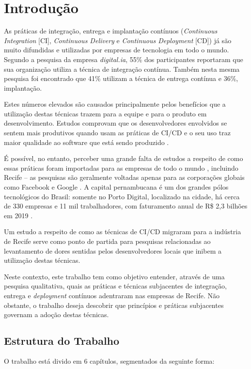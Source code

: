 
\chapter{Introdução}

As práticas de integração, entrega e implantação contínuos \cite{fowlerCI, fowlerCD} (\emph{Continuous Integration} [CI], \emph{Continuous Delivery} e \emph{Continuous Deployment} [CD]) já são muito difundidas e utilizadas por empresas de tecnologia em todo o mundo. Segundo a pesquisa da empresa \emph{digital.ia}\cite{stateAgileReport2020}, 55\% dos participantes reportaram que sua organização utiliza a técnica de integração contínua. Também nesta mesma pesquisa foi encontrado que 41\% utilizam a técnica de entrega contínua e 36\%, implantação.

Estes números elevados são causados principalmente pelos benefícios que a utilização destas técnicas trazem para a equipe e para o produto em desenvolvimento. Estudos comprovam que os desenvolvedores envolvidos se sentem mais produtivos quando usam as práticas de CI/CD \cite{hilton2016} e o seu uso traz maior qualidade ao software que está sendo produzido \cite{savor2015}. 

É possível, no entanto, perceber uma grande falta de estudos a respeito de como essas práticas foram importadas para as empresas de todo o mundo \cite{empiricalStudy2016}, incluindo Recife -- as pesquisas são geralmente voltadas apenas para as corporações globais como Facebook \cite{savor2015} e Google \cite{googleCi}. A capital pernambucana é um dos grandes pólos tecnológicos do Brasil: somente no Porto Digital, localizado na cidade, há cerca de 330 empresas e 11 mil trabalhadores, com faturamento anual de R\$ 2,3 bilhões em 2019 \cite{portoDigital}.

Um estudo a respeito de como as técnicas de CI/CD migraram para a indústria de Recife serve como ponto de partida para pesquisas relacionadas ao levantamento de dores sentidas pelos desenvolvedores locais que inibem a utilização destas técnicas.

Neste contexto, este trabalho tem como objetivo entender, através de uma pesquisa qualitativa, quais as práticas e técnicas subjacentes de integração, entrega e \emph{deployment} contínuos adentraram nas empresas de Recife. Não obstante, o trabalho deseja descobrir que princípios e práticas subjacentes governam a adoção destas técnicas.

\section{Estrutura do Trabalho}
 O trabalho está divido em 6 capítulos, segmentados da seguinte forma:

